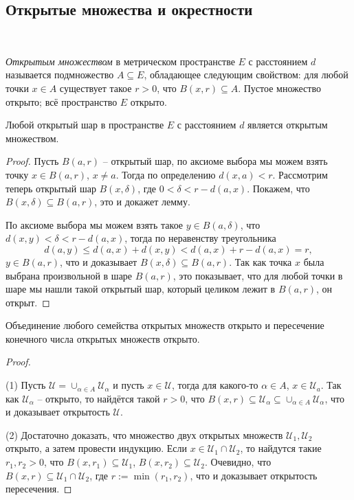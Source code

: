\subsection{Открытые множества и окрестности}~

\begin{definition}\label{def_of_open}
    \textit{Открытым множеством} в метрическом пространстве $E$ с расстоянием $d$ называется подмножество $A \subseteq E$, обладающее следующим свойством: для любой точки $x \in A$ существует такое $r >0$, что $B(x,r) \subseteq A$. Пустое множество открыто; всё пространство $E$ открыто. 
\end{definition}

\begin{lemma}\label{open_ball=open}
    Любой открытый шар в пространстве $E$ с расстоянием $d$ является открытым множеством.
\end{lemma}
\begin{proof}
    Пусть $B(a,r)$ -- открытый шар, по аксиоме выбора мы можем взять точку $x \in B(a,r)$, $x \ne a$. Тогда по определению $d(x,a) < r$. Рассмотрим теперь открытый шар $B(x,\delta)$, где $0 < \delta < r- d(a,x).$ Покажем, что $B(x,\delta ) \subseteq B(a, r)$, это и докажет лемму.

    По аксиоме выбора мы можем взять такое $y \in B(a,\delta)$, что $d(x,y)<\delta < r - d(a,x) $, тогда по неравенству треугольника
    \[
      d(a,y) \le d(a,x) + d(x,y) < d(a,x) + r - d(a,x) = r, 
    \]
    \ie $y\in B(a,r)$, что и доказывает $B(x,\delta) \subseteq B(a,r)$. Так как точка $x$ была выбрана произвольной в шаре $B(a,r)$, это показывает, что для любой точки в шаре мы нашли такой открытый шар, который целиком лежит в $B(a,r)$, \ie он открыт.
\end{proof}

\begin{lemma}\label{union_and_cap_of_open}
    Объединение любого семейства открытых множеств открыто и пересечение конечного числа открытых множеств открыто. 
\end{lemma}
\begin{proof}\
 
(1) Пусть $\mathscr{U} = \cup_{\alpha \in A}\mathscr{U}_\alpha$ и пусть $x \in \mathscr{U}$, тогда для какого-то $\alpha \in A$, $x \in \mathscr{U}_a$. Так как $\mathscr{U}_\alpha$ -- открыто, то найдётся такой $r >0$, что $B(x, r ) \subseteq \mathscr{U}_\alpha \subseteq \cup_{\alpha \in A}\mathscr{U}_\alpha$, что и доказывает открытость $\mathscr{U}.$

(2) Достаточно доказать, что множество двух открытых множеств $\mathscr{U}_1, \mathscr{U}_2$ открыто, а затем провести индукцию. Если $x \in \mathscr{U}_1 \cap \mathscr{U}_2$, то найдутся такие $r_1, r_2 >0$, что $B(x, r_1) \subseteq \mathscr{U}_1$, $B(x, r_2) \subseteq \mathscr{U}_2$. Очевидно, что $B(x, r) \subseteq \mathscr{U}_1 \cap \mathscr{U}_2$, где $r:= \min(r_1, r_2)$, что и доказывает открытость пересечения.
\end{proof}

